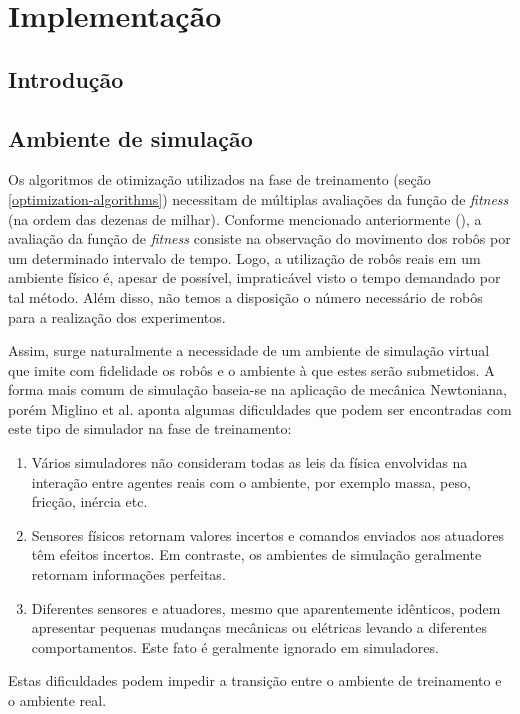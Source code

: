 \chapter{Implementação}
\label{implementacao}

\section{Introdução}

\section{Ambiente de simulação}

Os algoritmos de otimização utilizados na fase de treinamento (seção \ref{optimization-algorithms}) necessitam de múltiplas avaliações da função de \textit{fitness} (na ordem das dezenas de milhar). Conforme mencionado anteriormente (), a avaliação da função de \textit{fitness} consiste na observação do movimento dos robôs por um determinado intervalo de tempo. Logo, a utilização de robôs reais em um ambiente físico é, apesar de possível, impraticável visto o tempo demandado por tal método. Além disso, não temos a disposição o número necessário de robôs para a realização dos experimentos.

Assim, surge naturalmente a necessidade de um ambiente de simulação virtual que imite com fidelidade os robôs e o ambiente à que estes serão submetidos. A forma mais comum de simulação baseia-se na aplicação de mecânica Newtoniana, porém Miglino et al. \cite{miglino96evolving} aponta algumas dificuldades que podem ser encontradas com este tipo de simulador na fase de treinamento:
\begin{enumerate}
    \item Vários simuladores não consideram todas as leis da física envolvidas na interação entre agentes reais com o ambiente, por exemplo massa, peso, fricção, inércia etc.
    \item Sensores físicos retornam valores incertos e comandos enviados aos atuadores têm efeitos incertos. Em contraste, os ambientes de simulação geralmente retornam informações perfeitas.
    \item Diferentes sensores e atuadores, mesmo que aparentemente idênticos, podem apresentar pequenas mudanças mecânicas ou elétricas levando a diferentes comportamentos. Este fato é geralmente ignorado em simuladores.
\end{enumerate}

Estas dificuldades podem impedir a transição entre o ambiente de treinamento e o ambiente real.

